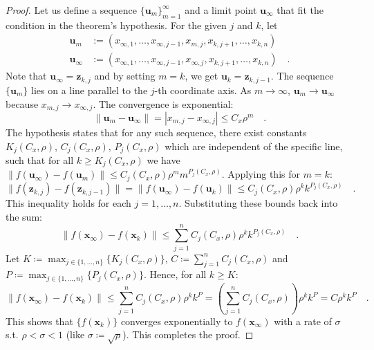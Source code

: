 \documentclass[../../main.tex]{subfiles}
\begin{document}
\begin{proof}
Let us define a sequence $\{\bm{u}_m\}_{m=1}^\infty$ and a limit point $\bm{u}_\infty$ that fit the condition in the theorem's hypothesis. For the given $j$ and $k$, let
\begin{align*}
    \bm{u}_m &:= (x_{\infty,1}, \dots, x_{\infty,j-1}, x_{m,j}, x_{k,j+1}, \dots, x_{k,n}) \\
    \bm{u}_\infty &:= (x_{\infty,1}, \dots, x_{\infty,j-1}, x_{\infty,j}, x_{k,j+1}, \dots, x_{k,n}) \quad .
\end{align*}
Note that $\bm{u}_\infty = \bm{z}_{k,j}$ and by setting $m=k$, we get $\bm{u}_k = \bm{z}_{k,j-1}$.
The sequence $\{\bm{u}_m\}$ lies on a line parallel to the $j$-th coordinate axis. As $m \to \infty$, $\bm{u}_m \to \bm{u}_\infty$ because $x_{m,j} \to x_{\infty,j}$. The convergence is exponential:
\[
    \|\bm{u}_m - \bm{u}_\infty\| = |x_{m,j} - x_{\infty,j}| \le C_x \rho^m \quad .
\]
The hypothesis states that for any such sequence, there exist constants $K_j(C_x, \rho)$, $C_j(C_x, \rho)$, $P_j(C_x, \rho)$ which are independent of the specific line, such that for all $k \geq K_j(C_x, \rho)$ we have $\|f(\bm{u}_\infty) - f(\bm{u}_m)\| \le C_j(C_x, \rho) \rho^m m^{P_j(C_x, \rho)}$. Applying this for $m=k$:
\[
    \|f(\bm{z}_{k,j}) - f(\bm{z}_{k,j-1})\| = \|f(\bm{u}_\infty) - f(\bm{u}_k)\| \leq C_j(C_x, \rho) \rho^k k^{P_j(C_x, \rho)} \quad .
\]
This inequality holds for each $j=1, \dots, n$. Substituting these bounds back into the sum:
\[
    \|f(\bm{x}_\infty) - f(\bm{x}_k)\| \le \sum_{j=1}^{n} C_j(C_x, \rho) \rho^k k^{P_j(C_x, \rho)} \quad .
\]
Let $K \coloneqq \max_{j \in \{1, \dots, n\}} \{K_j(C_x, \rho)\}$, $C \coloneqq \sum_{j=1}^{n} C_j(C_x, \rho)$ and \\
$P \coloneqq \max_{j \in \{1, \dots, n\}} \{P_j(C_x, \rho)\}$. Hence, for all $k \geq K$:
\[
    \|f(\bm{x}_\infty) - f(\bm{x}_k)\| \le \sum_{j=1}^{n} C_j(C_x, \rho) \rho^k k^P = \left( \sum_{j=1}^{n} C_j(C_x, \rho) \right) \rho^k k^P = C \rho^k k^P \quad .
\]
This shows that $\{f(\bm{x}_k)\}$ converges exponentially to $f(\bm{x}_\infty)$ with a rate of $\sigma$ s.t. $\rho < \sigma < 1$ (like $\sigma \coloneqq \sqrt{\rho}$). This completes the proof.
\end{proof}
\end{document}
